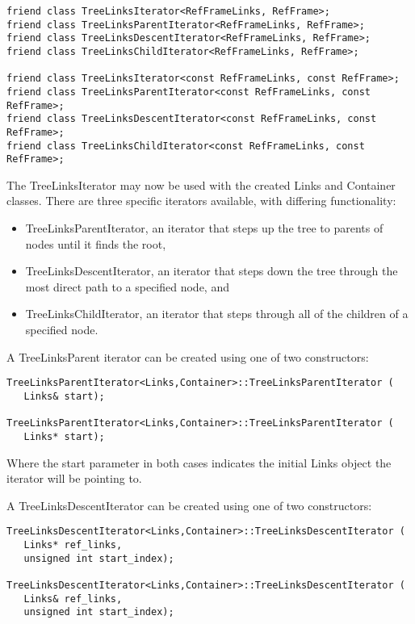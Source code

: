\begin{verbatim}
friend class TreeLinksIterator<RefFrameLinks, RefFrame>;
friend class TreeLinksParentIterator<RefFrameLinks, RefFrame>;
friend class TreeLinksDescentIterator<RefFrameLinks, RefFrame>;
friend class TreeLinksChildIterator<RefFrameLinks, RefFrame>;

friend class TreeLinksIterator<const RefFrameLinks, const RefFrame>;
friend class TreeLinksParentIterator<const RefFrameLinks, const RefFrame>;
friend class TreeLinksDescentIterator<const RefFrameLinks, const RefFrame>;
friend class TreeLinksChildIterator<const RefFrameLinks, const RefFrame>;
\end{verbatim}

The TreeLinksIterator may now be used with the created Links and Container
classes. There are three specific iterators available, with
differing functionality:

\begin{itemize}
\item{TreeLinksParentIterator}, an iterator that steps up the tree to
parents of nodes until it finds the root,
\item{TreeLinksDescentIterator}, an iterator that steps down the tree
through the most direct path to a specified node, and
\item{TreeLinksChildIterator}, an iterator that steps through all of the
children of a specified node.
\end{itemize}

A TreeLinksParent iterator can be created using one of two constructors:

\begin{verbatim}
TreeLinksParentIterator<Links,Container>::TreeLinksParentIterator (
   Links& start);

TreeLinksParentIterator<Links,Container>::TreeLinksParentIterator (
   Links* start);
\end{verbatim}

Where the start parameter in both cases indicates the initial Links
object the iterator will be pointing to.

A TreeLinksDescentIterator can be created using one of two constructors:

\begin{verbatim}
TreeLinksDescentIterator<Links,Container>::TreeLinksDescentIterator (
   Links* ref_links,
   unsigned int start_index);

TreeLinksDescentIterator<Links,Container>::TreeLinksDescentIterator (
   Links& ref_links,
   unsigned int start_index);
\end{verbatim}


